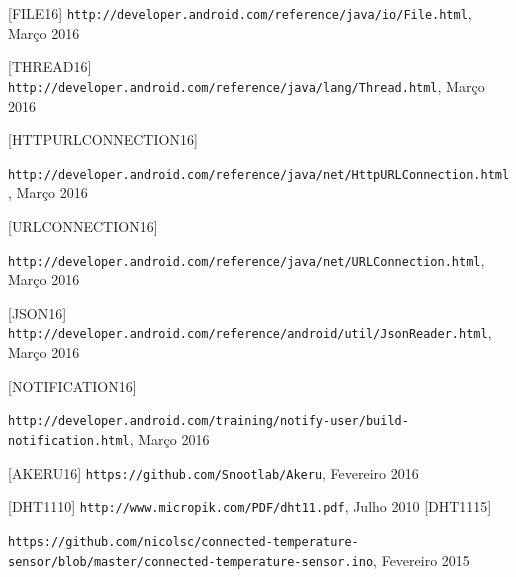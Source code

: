 \documentclass[a4paper]{article}
\begin{document}
\begin{thebibliography}{9}

  [FILE16] \texttt{http://developer.android.com/reference/java/io/File.html}, Março 2016
  
  [THREAD16] \texttt{http://developer.android.com/reference/java/lang/Thread.html}, Março 2016
  
  [HTTPURLCONNECTION16] \begin{sloppypar} \texttt{http://developer.android.com/reference/java/net/HttpURLConnection.html}, Março 2016 \end{sloppypar}
  
  [URLCONNECTION16] \begin{sloppypar}\texttt{http://developer.android.com/reference/java/net/URLConnection.html}, Março 2016 \end{sloppypar}
  
  [JSON16] \texttt{http://developer.android.com/reference/android/util/JsonReader.html}, Março 2016
  
  [NOTIFICATION16] \begin{sloppypar}\texttt{http://developer.android.com/training/notify-user/build-notification.html}, Março 2016 \end{sloppypar}
  
  [AKERU16] \texttt{https://github.com/Snootlab/Akeru}, Fevereiro 2016
  
  [DHT1110] \texttt{http://www.micropik.com/PDF/dht11.pdf}, Julho 2010
  [DHT1115] \begin{sloppypar} \texttt{https://github.com/nicolsc/connected-temperature-sensor/blob/master/connected-temperature-sensor.ino}, Fevereiro 2015  \end{sloppypar}


\end{thebibliography}
\end{document}
